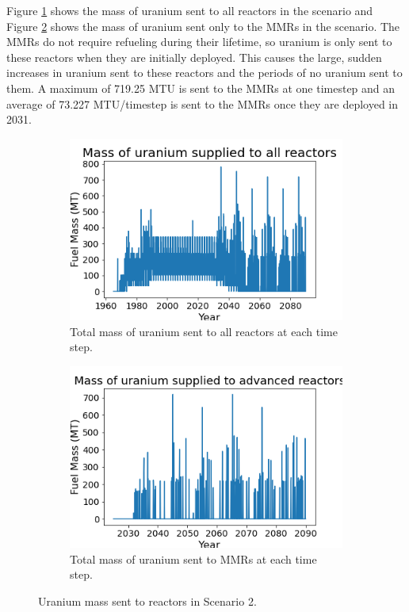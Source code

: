 Figure \ref{fig:totalfuel_2} shows the mass of uranium sent to all 
reactors in the scenario and Figure \ref{fig:haleu_2} shows the mass 
of uranium sent only to the \glspl{MMR} in the scenario. The \glspl{MMR} 
do not require refueling during their lifetime, so uranium is only 
sent to these reactors when they are initially deployed. This causes the 
large, sudden increases in uranium sent to these reactors and the periods of 
no uranium sent to them. A maximum of 719.25 MTU is sent to the \glspl{MMR} 
at one timestep and an average of 73.227 MTU/timestep is sent to the \glspl{MMR} 
once they are deployed in 2031.   

\begin{figure}
    \centering
    \begin{subfigure}{0.4\textwidth}
        \centering
        \includegraphics[scale=0.3]{figures/fuelsupply_scenarios_2.png}
        \caption{Total mass of uranium sent to all reactors at each time step.}
        \label{fig:totalfuel_2}
    \end{subfigure}
    \begin{subfigure}{0.4\textwidth}
        \centering
        \includegraphics[scale=0.3]{figures/advancedRX_fuelsupply_scenarios_2.png}
        \caption{Total mass of uranium sent to \glspl{MMR} at each time step.}
        \label{fig:haleu_2}
    \end{subfigure}
    \caption{Uranium mass sent to reactors in Scenario 2.}
    \label{fig:fuel_2}
\end{figure}

